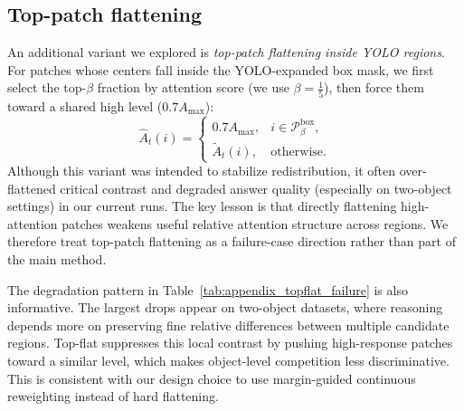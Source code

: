 \documentclass{article}
\begin{document}
\subsection{Top-patch flattening}
An additional variant we explored is \emph{top-patch flattening inside
YOLO regions}. For patches whose centers fall inside the YOLO-expanded
box mask, we first select the top-$\beta$ fraction by attention score
(we use $\beta=\frac{1}{5}$), then force them toward a shared high level
($0.7A_{\max}$):
\begin{equation}
  \hat{A}_t(i)=
  \begin{cases}
    0.7A_{\max}, & i\in\mathcal{P}^{\text{box}}_{\beta},\\
    \tilde{A}_t(i), & \text{otherwise}.
  \end{cases}
\end{equation}
Although this variant was intended to stabilize redistribution, it often
over-flattened critical contrast and degraded answer quality
(especially on two-object settings) in our current runs. The key lesson
is that directly flattening high-attention patches weakens useful
relative attention structure across regions. We therefore treat
top-patch flattening as a failure-case direction rather than part of the
main method.

\begin{table}[H]
  \centering
  \caption{Top-patch flattening failure on four datasets (200-sample setting, compared with \texttt{adapt\_vis}).}
  \label{tab:appendix_topflat_failure}
\end{table}

The degradation pattern in Table~\ref{tab:appendix_topflat_failure} is
also informative. The largest drops appear on two-object datasets,
where reasoning depends more on preserving fine relative differences
between multiple candidate regions. Top-flat suppresses this local
contrast by pushing high-response patches toward a similar level, which
makes object-level competition less discriminative. This is consistent
with our design choice to use margin-guided continuous reweighting
instead of hard flattening.
\end{document}
